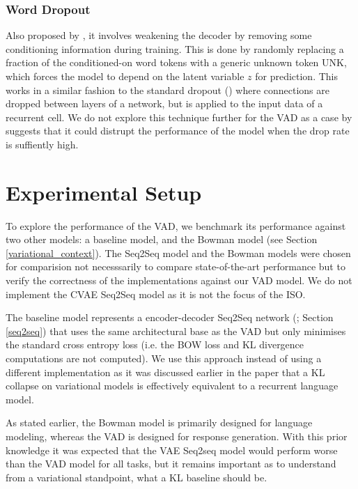 \documentclass[12pt,twoside]{report}
\begin{document}
\subsection{Word Dropout}
Also proposed by \cite{bowman_generating_2015}, it involves weakening the decoder by removing some conditioning information during training. This is done by randomly replacing a fraction of the conditioned-on word tokens with a generic unknown token UNK, which forces the model to depend on the latent variable $z$ for prediction. This works in a similar fashion to the standard dropout (\cite{srivastava_dropout:_2014}) where connections are dropped between layers of a network, but is applied to the input data of a recurrent cell. We do not explore this technique further for the VAD as a case by \cite{bowman_generating_2015} suggests that it could distrupt the performance of the model when the drop rate is suffiently high.

\chapter{Experimental Setup}

To explore the performance of the VAD, we benchmark its performance against two other models: a baseline model, and the Bowman model (see Section \ref{variational_context}). The Seq2Seq model and the Bowman models were chosen for comparision not necesssarily to compare state-of-the-art performance but to verify the correctness of the implementations against our VAD model. We do not implement the CVAE Seq2Seq model as it is not the focus of the ISO.

The baseline model represents a encoder-decoder Seq2Seq network (\cite{sutskever_sequence_2014}; Section \ref{seq2seq}) that uses the same architectural base as the VAD but only minimises the standard cross entropy loss (i.e. the BOW loss and KL divergence computations are not computed). We use this approach instead of using a different implementation as it was discussed earlier in the paper that a KL collapse on variational models is effectively equivalent to a recurrent language model.

As stated earlier, the Bowman model is primarily designed for language modeling, whereas the VAD is designed for response generation. With this prior knowledge it was expected that the VAE Seq2seq model would perform worse than the VAD model for all tasks, but it remains important as to understand from a variational standpoint, what a KL baseline should be.
\end{document}
